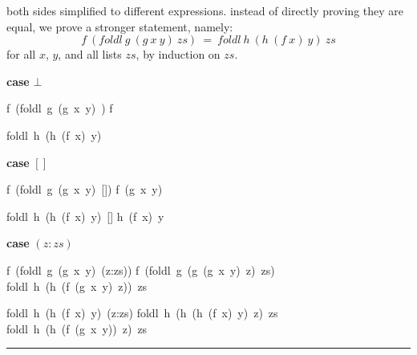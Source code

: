 \documentclass[twoside]{article}
\newenvironment{proof}{{\bf Proof:}}{\hfill\rule{2mm}{2mm}}
\begin{document}
\begin{proof}
both sides simplified to different expressions. instead of directly proving
they are equal, we prove a stronger statement, namely:
$$f~(foldl~g~(g~x~y)~zs)~=~foldl~h~(h~(f~x)~y)~zs$$
for all $x$, $y$, and all lists $zs$, by induction on $zs$.

\textbf{case} $\bot$

\begin{minipage}[t]{.4\textwidth}
\begin{calculation}
  f~(foldl~g~(g~x~y)~\bot)
  f~\bot
{}
  \bot
\end{calculation}
\end{minipage}%
\begin{minipage}[t]{.4\textwidth}
\begin{calculation}
  foldl~h~(h~(f~x)~y)~\bot
{}
  \bot
\end{calculation}
\end{minipage}

\textbf{case} $[]$
\begin{minipage}[t]{.4\textwidth}
\begin{calculation}
  f~(foldl~g~(g~x~y)~[])
  f~(g~x~y)
\end{calculation}
\end{minipage}%
\begin{minipage}[t]{.4\textwidth}
\begin{calculation}
  foldl~h~(h~(f~x)~y)~[]
  h~(f~x)~y
\end{calculation}
\end{minipage}

\textbf{case} $(z:zs)$

\begin{minipage}[t]{.4\textwidth}
\begin{calculation}
  f~(foldl~g~(g~x~y)~(z:zs))
  f~(foldl~g~(g~(g~x~y)~z)~zs)
  foldl~h~(h~(f~(g~x~y)~z))~zs
\end{calculation}
\end{minipage}\hspace{.1\textwidth}%
\begin{minipage}[t]{.4\textwidth}
\begin{calculation}
  foldl~h~(h~(f~x)~y)~(z:zs)
  foldl~h~(h~(h~(f~x)~y)~z)~zs
  foldl~h~(h~(f~(g~x~y))~z)~zs
\end{calculation}
\end{minipage}
\end{proof}
\end{document}
